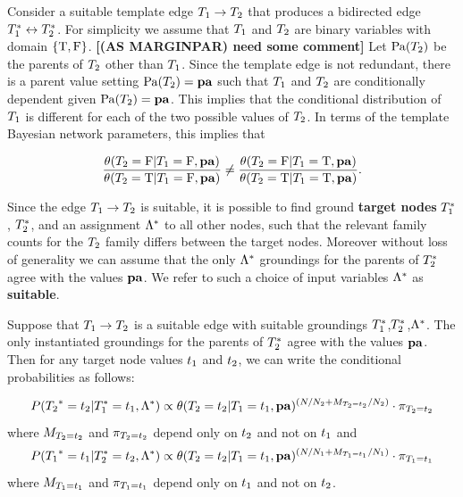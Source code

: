 \documentclass[runningheads,a4paper]{llncs}
\renewcommand{\marginpar}[1]{\fixneeded{(AS MARGINPAR) #1}}
\newcommand{\fixneeded}[1]{\textbf{[\footnotesize #1]}}
\begin{document}
Consider a suitable template edge $T_{1} \rightarrow T_{2}$ that produces a bidirected edge $T_{1}^{*}\hspace{0.0ex} \leftrightarrow T_{2}^{*}\hspace{0.0ex}$. For simplicity we assume that $T_{1}$ and $T_{2}$ are binary variables with domain $\{\mathrm{T},\mathrm{F}\}$. \marginpar{need some comment} Let $\mathrm{Pa}(T_{2})$ be the parents of $T_{2}$ other than $T_{1}$. Since the template edge is not redundant, there is a parent value setting $\mathrm{Pa}(T_{2}) = \mathbf{pa}$ such that $T_{1}$ and $T_{2}$ are conditionally dependent given $\mathrm{Pa}(T_{2}) = \mathbf{pa}$. This implies that the conditional distribution of $T_{1}$ is different for each of the two possible values of $T_{2}$. In terms of the template Bayesian network parameters, this implies that

\begin{equation} \label{eq:dependence}
\frac{\theta(T_{2} = \mathrm{F}|T_{1} = \mathrm{F},\mathbf{pa})}{\theta(T_{2} = \mathrm{T}|T_{1} = \mathrm{F},\mathbf{pa})} \neq \frac{\theta(T_{2} = \mathrm{F}|T_{1} = \mathrm{T},\mathbf{pa})}{\theta(T_{2} = \mathrm{T}|T_{1} = \mathrm{T},\mathbf{pa})}.
\end{equation}

Since the edge $T_{1} \rightarrow T_{2}$ is suitable, it is possible to find ground \textbf{target nodes} $T_{1}^{*}\hspace{0.0ex}$, $T_{2}^{*}\hspace{0.0ex}$, and an assignment $\Lambda^{*}\hspace{0.0ex}$ to all other nodes, such that the relevant family counts for the $T_{2}$ family differs between the target nodes. Moreover without loss of generality we can assume that  the only $\Lambda^{*}\hspace{0.0ex}$ groundings for the parents of $T_{2}^{*}\hspace{0.0ex}$ agree with the values $\mathbf{pa}$. We refer to such a choice of input variables $\Lambda^{*}\hspace{0.0ex}$ as \textbf{suitable}.


\begin{lemma} \label{lemma:decompose-cond}
Suppose that $T_{1} \rightarrow T_{2}$ is a suitable edge with suitable groundings $T_{1}^{*}\hspace{0.0ex}$,$T_{2}^{*}\hspace{0.0ex}$,$\Lambda^{*}\hspace{0.0ex}$. The only instantiated groundings for the parents of $T_{2}^{*}\hspace{0.0ex}$ agree with the values $\mathbf{pa}$. Then for any target node values $t_{1}$ and $t_{2}$, we can write the conditional probabilities as follows:

\begin{equation}
P({T_{2}}^{*}\hspace{0.0ex} = t_{2} | T_{1}^{*}\hspace{0.0ex} = t_{1},\Lambda^{*}\hspace{0.0ex}) \propto \theta(T_{2} = t_{2}|T_{1} = t_{1},\mathbf{pa})^{(N/N_{2}+M_{T_2=t_{2}}/N_{2})} \cdot \pi_{T_2=t_{2}} \label{eq:decompose-t2}
\end{equation}
where $M_{T_2=t_{2}}$ and $\pi_{T_2=t_{2}}$ depend only on $t_{2}$ and not on $t_{1}$ and
\begin{equation}
P({T_{1}}^{*}\hspace{0.0ex} = t_{1} | T_{2}^{*}\hspace{0.0ex} = t_{2},\Lambda^{*}\hspace{0.0ex}) \propto \theta(T_{2} = t_{2}|T_{1} = t_{1},\mathbf{pa})^{(N/N_{1}+M_{T_1=t_{1}}/N_{1})} \cdot \pi_{T_1=t_{1}} \label{eq:decompose-t1}
\end{equation} 
where $M_{T_1=t_{1}}$ and $\pi_{T_1=t_{1}}$ depend only on $t_{1}$ and not on $t_{2}$.
\end{lemma}
\end{document}
